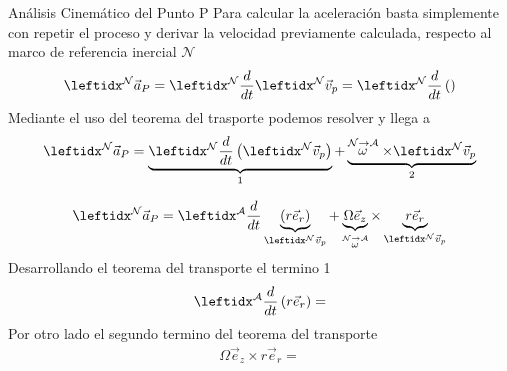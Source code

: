 \begin{sol}
\begin{cinematicaUnificada}{Análisis Cinemático del Punto P}
        Para calcular la aceleración basta simplemente con repetir el proceso y derivar la velocidad previamente calculada, respecto al marco de referencia inercial $\mathcal{N}$
        \begin{equation}
            \marc{}{N}\vec{a}_P=\der{}{N}\marc{}{N}\vec{v}_p=\der{}{N}\left(\right)
        \end{equation}
        Mediante el uso del teorema del trasporte podemos resolver y llega a 
        \begin{equation}
            \marc{}{N}\vec{a}_P=\transportad{\marc{}{N}\vec{v}_p}{N}{A}
        \end{equation}
        
        
        
        \begin{equation}
            \marc{}{N}\vec{a}_P=\transD{r\vec{e}_r}{\Omega\vec{e}_z}{N}{A}{\marc{}{N}\vec{v}_p}
        \end{equation}
        Desarrollando el teorema del transporte el termino 1
        \begin{align}
            \der{}{A}\left(r\vec{e}_r\right)=
        \end{align}
        Por otro lado el segundo termino del teorema del transporte
        \begin{align}
            \Omega\vec{e}_z\times r\vec{e}_r=
        \end{align}

    \end{cinematicaUnificada}

\end{sol}